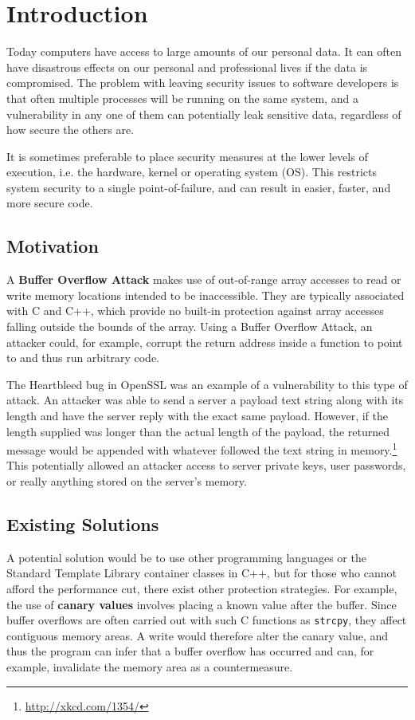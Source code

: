 \chapter{Introduction}
Today computers have access to large amounts of our personal data. It can often have disastrous effects on our personal and professional lives if the data is compromised. The problem with leaving security issues to software developers is that often multiple processes will be running on the same system, and a vulnerability in any one of them can potentially leak sensitive data, regardless of how secure the others are.

It is sometimes preferable to place security measures at the lower levels of execution, i.e. the hardware, kernel or operating system (OS). This restricts system security to a single point-of-failure, and can result in easier, faster, and more secure code.

\section{Motivation}
A \textbf{Buffer Overflow Attack} makes use of out-of-range array accesses to read or write memory locations intended to be inaccessible. They are typically associated with C and C++, which provide no built-in protection against array accesses falling outside the bounds of the array. Using a Buffer Overflow Attack, an attacker could, for example, corrupt the return address inside a function to point to and thus run arbitrary code.

The Heartbleed bug in OpenSSL\cite{heartbleed} was an example of a vulnerability to this type of attack. An attacker was able to send a server a payload text string along with its length and have the server reply with the exact same payload. However, if the length supplied was longer than the actual length of the payload, the returned message would be appended with whatever followed the text string in memory.\footnote{\url{http://xkcd.com/1354/}} This potentially allowed an attacker access to server private keys, user passwords, or really anything stored on the server's memory.

\section{Existing Solutions}
A potential solution would be to use other programming languages or the Standard Template Library container classes in C++, but for those who cannot afford the performance cut, there exist other protection strategies. For example, the use of \textbf{canary values} involves placing a known value after the buffer. Since buffer overflows are often carried out with such C functions as \verb|strcpy|, they affect contiguous memory areas. A write would therefore alter the canary value, and thus the program can infer that a buffer overflow has occurred and can, for example, invalidate the memory area as a countermeasure.

